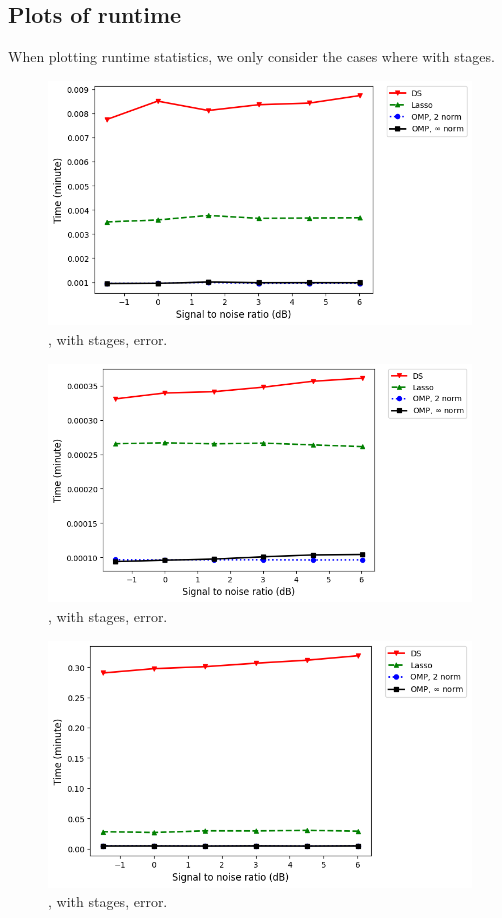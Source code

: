 \subsection {Plots of runtime}

When plotting runtime statistics, we only consider the cases where  with  stages.
%
\begin {figure} [H]
\includegraphics [width = \textwidth] {time-medium-more-square-six-usual.png}
\caption {, with  stages, error.}
\end {figure}
%
\begin {figure} [H]
\includegraphics [width = \textwidth] {time-small-more-square-six-usual.png}
\caption {, with  stages, error.}
\end {figure}
%
\begin {figure} [H]
\includegraphics [width = \textwidth] {time-big-more-square-six-usual.png}
\caption {, with  stages, error.}
\end {figure}
